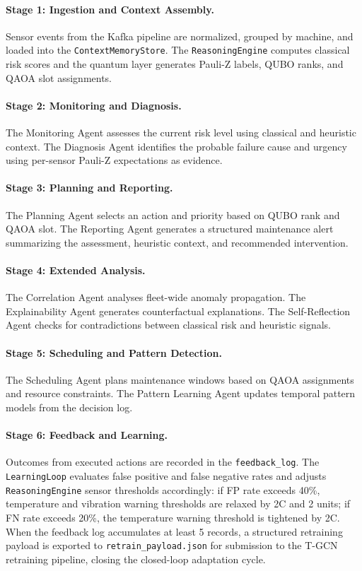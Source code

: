 \paragraph{Stage 1: Ingestion and Context Assembly.} Sensor events from the Kafka pipeline are normalized, grouped by machine, and loaded into the \texttt{ContextMemoryStore}. The \texttt{ReasoningEngine} computes classical risk scores and the quantum layer generates Pauli-Z labels, QUBO ranks, and QAOA slot assignments.

\paragraph{Stage 2: Monitoring and Diagnosis.} The Monitoring Agent assesses the current risk level using classical and heuristic context. The Diagnosis Agent identifies the probable failure cause and urgency using per-sensor Pauli-Z expectations as evidence.

\paragraph{Stage 3: Planning and Reporting.} The Planning Agent selects an action and priority based on QUBO rank and QAOA slot. The Reporting Agent generates a structured maintenance alert summarizing the assessment, heuristic context, and recommended intervention.

\paragraph{Stage 4: Extended Analysis.} The Correlation Agent analyses fleet-wide anomaly propagation. The Explainability Agent generates counterfactual explanations. The Self-Reflection Agent checks for contradictions between classical risk and heuristic signals.

\paragraph{Stage 5: Scheduling and Pattern Detection.} The Scheduling Agent plans maintenance windows based on QAOA assignments and resource constraints. The Pattern Learning Agent updates temporal pattern models from the decision log.

\paragraph{Stage 6: Feedback and Learning.} Outcomes from executed actions are recorded in the \texttt{feedback\_log}. The \texttt{LearningLoop} evaluates false positive and false negative rates and adjusts \texttt{ReasoningEngine} sensor thresholds accordingly: if FP rate exceeds 40\%, temperature and vibration warning thresholds are relaxed by 2\textdegree C and 2 units; if FN rate exceeds 20\%, the temperature warning threshold is tightened by 2\textdegree C. When the feedback log accumulates at least 5 records, a structured retraining payload is exported to \texttt{retrain\_payload.json} for submission to the T-GCN retraining pipeline, closing the closed-loop adaptation cycle.


